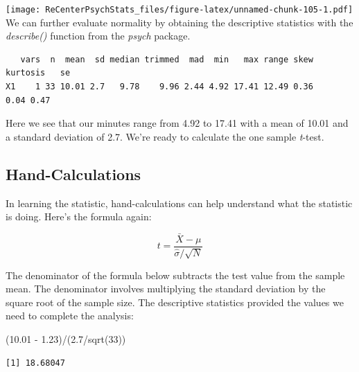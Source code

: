 \documentclass[
  11pt,
]{book}
\newenvironment{Shaded}{\begin{snugshade}}{\end{snugshade}}
\newcommand{\DecValTok}[1]{\textcolor[rgb]{0.00,0.00,0.81}{#1}}
\newcommand{\FloatTok}[1]{\textcolor[rgb]{0.00,0.00,0.81}{#1}}
\newcommand{\FunctionTok}[1]{\textcolor[rgb]{0.00,0.00,0.00}{#1}}
\newcommand{\NormalTok}[1]{#1}
\newcommand{\SpecialCharTok}[1]{\textcolor[rgb]{0.00,0.00,0.00}{#1}}
\begin{document}
\texttt{[image: ReCenterPsychStats\_files/figure-latex/unnamed-chunk-105-1.pdf]}
We can further evaluate normality by obtaining the descriptive statistics with the \emph{describe()} function from the \emph{psych} package.

\begin{Shaded}
\end{Shaded}

\begin{verbatim}
   vars  n  mean  sd median trimmed  mad  min   max range skew kurtosis   se
X1    1 33 10.01 2.7   9.78    9.96 2.44 4.92 17.41 12.49 0.36     0.04 0.47
\end{verbatim}

Here we see that our minutes range from 4.92 to 17.41 with a mean of 10.01 and a standard deviation of 2.7. We're ready to calculate the one sample \emph{t}-test.

\hypertarget{hand-calculations}{%
\subsection{Hand-Calculations}\label{hand-calculations}}

In learning the statistic, hand-calculations can help understand what the statistic is doing. Here's the formula again:

\[
t = \frac{\bar{X} - \mu}{\hat{\sigma}/\sqrt{N} }
\]

The denominator of the formula below subtracts the test value from the sample mean. The denominator involves multiplying the standard deviation by the square root of the sample size. The descriptive statistics provided the values we need to complete the analysis:

\begin{Shaded}
\begin{Highlighting}[]
\NormalTok{(}\FloatTok{10.01} \SpecialCharTok{{-}} \FloatTok{1.23}\NormalTok{)}\SpecialCharTok{/}\NormalTok{(}\FloatTok{2.7}\SpecialCharTok{/}\FunctionTok{sqrt}\NormalTok{(}\DecValTok{33}\NormalTok{))}
\end{Highlighting}
\end{Shaded}

\begin{verbatim}
[1] 18.68047
\end{verbatim}
\end{document}
